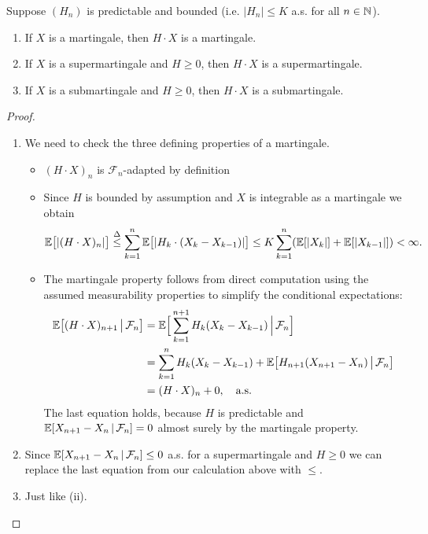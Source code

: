 \begin{lsatz}
\begin{theorem}\label{you_cannot_beat_the_system}
	Suppose $(H_n)$ is predictable and bounded (i.e. $\lvert H_n\rvert \leq K$ a.s. for all $n\in \mathbb{N}$).
	\begin{enumerate}[label=(\roman*)]	
		\item
			If $X$ is a martingale, then $H\cdot X$ is  a martingale.
		\item
			If $X$ is a supermartingale and $H \geq 0$, then $H\cdot X$ is a supermartingale.
		\item
			If $X$ is a submartingale and $H \geq 0$, then $H\cdot X$ is a submartingale.	
	\end{enumerate}
\end{theorem}
\end{lsatz}
\begin{proof}
	\begin{enumerate}[label=(\roman*)]	
		\item We need to check the three defining properties of a martingale.
			\begin{itemize}
				\item
					$(H\cdot X)_n$ is $\mathcal F_n$-adapted by definition
				\item Since $H$ is bounded by assumption and $X$ is integrable as a martingale we obtain
				\begin{align*}
					\mathbb{E}\big[|(H\cdot X )_n|\big] \overset{\Delta}{\leq}  \sum\limits_{k=1}^{n}\mathbb{E}\big[|H_k \cdot (X_k - X_{k-1})|\big] \leq K \sum_{k=1}^n (\mathbb{E}[|X_k|]+\mathbb{E}[|X_{k-1}|])<\infty.
				\end{align*}
							\item
				The martingale property follows from direct computation using the assumed measurability properties to simplify the conditional expectations:
					\begin{align*}
						\mathbb{E}\big[ (H\cdot X)_{n+1}\,\big|\,\mathcal{F}_n\big] &= \mathbb{E} \Big[ \sum\limits_{k=1}^{n+1} H_k (X_k-X_{k-1})\,\Big|\, \mathcal{F}_n \Big] \\
						&=\sum\limits_{k=1}^{n} H_k(X_k-X_{k-1}) + \mathbb{E}\big[ H_{n+1}(X_{n+1}-X_n)\,\big|\,\mathcal{F}_n\big] \\
						&= (H\cdot X)_n+0,\quad \text{a.s.}
					\end{align*}
					The last equation holds, because $H$ is predictable and $\mathbb{E}[X_{n+1}-X_n\,|\,\mathcal{F}_n]=0$ almost surely by the martingale property.
			\end{itemize}
		\item
			Since $\mathbb{E}[X_{n+1}-X_n\,|\,\mathcal{F}_n]\leq 0$ a.s. for a supermartingale and $H \geq 0$ we can replace the last equation from our calculation above with $\leq$.
		\item
			Just like (ii).
	\end{enumerate}
\end{proof}
